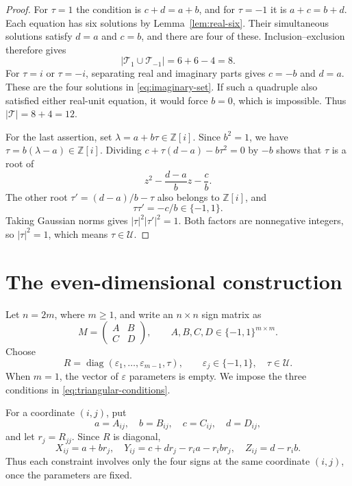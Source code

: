 \documentclass[11pt]{amsart}
\theoremstyle{definition}
\theoremstyle{remark}
\newcommand{\Z}{\mathbb Z}
\newcommand{\C}{\mathbb C}
\newcommand{\U}{\mathcal U}
\DeclareMathOperator{\diag}{diag}
\numberwithin{equation}{section}
\begin{document}
\begin{proof}
For $\tau=1$ the condition is $c+d=a+b$, and for $\tau=-1$ it is $a+c=b+d$. Each equation has six solutions by Lemma~\ref{lem:real-six}. Their simultaneous solutions satisfy $d=a$ and $c=b$, and there are four of these. Inclusion--exclusion therefore gives
\[
 |\mathcal T_1\cup\mathcal T_{-1}|=6+6-4=8.
\]
For $\tau=i$ or $\tau=-i$, separating real and imaginary parts gives $c=-b$ and $d=a$. These are the four solutions in \eqref{eq:imaginary-set}. If such a quadruple also satisfied either real-unit equation, it would force $b=0$, which is impossible. Thus $|\mathcal T|=8+4=12$.

For the last assertion, set $\lambda=a+b\tau\in\Z[i]$. Since $b^2=1$, we have $\tau=b(\lambda-a)\in\Z[i]$. Dividing $c+\tau(d-a)-b\tau^2=0$ by $-b$ shows that $\tau$ is a root of
\[
 z^2-\frac{d-a}{b}z-\frac cb.
\]
The other root $\tau'=(d-a)/b-\tau$ also belongs to $\Z[i]$, and
\[
 \tau\tau'=-c/b\in\{-1,1\}.
\]
Taking Gaussian norms gives $|\tau|^2|\tau'|^2=1$. Both factors are nonnegative integers, so $|\tau|^2=1$, which means $\tau\in\U$.
\end{proof}

\section{The even-dimensional construction}\label{sec:even}

Let $n=2m$, where $m\geq1$, and write an $n\times n$ sign matrix as
\[
 M=\begin{pmatrix}A&B\\C&D\end{pmatrix},
 \qquad A,B,C,D\in\{-1,1\}^{m\times m}.
\]
Choose
\begin{equation}\label{eq:even-R}
 R=\diag(\varepsilon_1,\ldots,\varepsilon_{m-1},\tau),
 \qquad \varepsilon_j\in\{-1,1\},\quad \tau\in\U.
\end{equation}
When $m=1$, the vector of $\varepsilon$ parameters is empty. We impose the three conditions in \eqref{eq:triangular-conditions}.

For a coordinate $(i,j)$, put
\[
 a=A_{ij},\quad b=B_{ij},\quad c=C_{ij},\quad d=D_{ij},
\]
and let $r_j=R_{jj}$. Since $R$ is diagonal,
\begin{equation}\label{eq:local-entries}
 X_{ij}=a+br_j,\quad
 Y_{ij}=c+dr_j-r_i a-r_i b r_j,\quad
 Z_{ij}=d-r_i b.
\end{equation}
Thus each constraint involves only the four signs at the same coordinate $(i,j)$, once the parameters are fixed.
\end{document}
